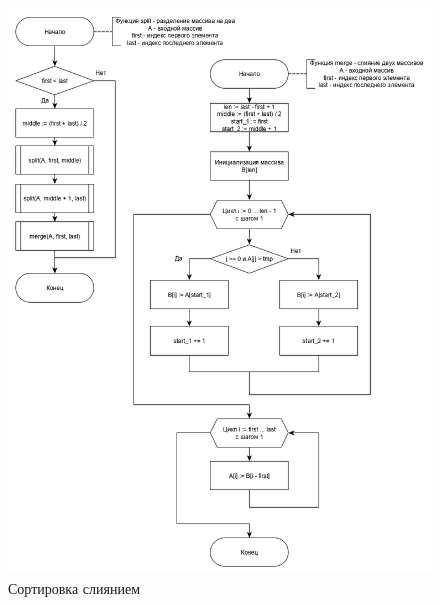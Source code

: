 \documentclass[12pt, a4paper]{report}
\begin{document}
	\begin{figure}[ht!]
		\centering
		\includegraphics[scale=0.55]{merge.png}
		\caption{Сортировка слиянием}
		\label{pic:merge}
	\end{figure}
	\newpage
\end{document}
